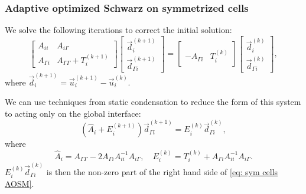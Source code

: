 \documentclass[10pt]{beamer}
\begin{document}
\begin{frame}
\frametitle{Adaptive optimized Schwarz on symmetrized cells}

We solve the following iterations to correct the initial solution:
\begin{equation} \label{eq: sym cells AOSM}
	\begin{bmatrix}
		A_{ii} & A_{i \Gamma} \\
		A_{\Gamma i} & A_{\Gamma \Gamma} + T_i^{(k+1)}
	\end{bmatrix}
	\begin{bmatrix} \vec{d}_i^{(k+1)} \\ \vec{d}_{\Gamma i}^{(k+1)} \end{bmatrix}
	=
	\begin{bmatrix} ~ \\ -A_{\Gamma i} & T_i^{(k)} \end{bmatrix}
	\begin{bmatrix} \vec{d}_i^{(k)} \\ \vec{d}_{\Gamma i}^{(k)} \end{bmatrix},
\end{equation}
where $\vec{d}_i^{(k+1)} = \vec{u}_i^{(k+1)} - \vec{u}_i^{(k)}$.

We can use techniques from static condensation to reduce the form of this system to acting only on the global interface:
\begin{equation} \label{eq: static}
	\left ( \hat{A}_i + E_i^{(k+1)} \right ) \vec{d}_{\Gamma i}^{(k+1)} = E_i^{(k)} \vec{d}_{\Gamma i}^{(k)},
\end{equation}
where
\begin{equation*}
	\hat{A}_i = A_{\Gamma \Gamma} - 2 A_{\Gamma i} A_{ii}^{-1} A_{i \Gamma}, \quad E_i^{(k)} = T_i^{(k)} + A_{\Gamma i} A_{ii}^{-1} A_{i \Gamma}.
\end{equation*}
$E_i^{(k)} \vec{d}_{\Gamma i}^{(k)}$ is then the non-zero part of the right hand side of \eqref{eq: sym cells AOSM}.

\end{frame}
\end{document}
